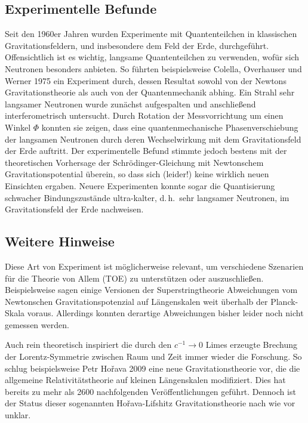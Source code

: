 \documentclass{scrartcl}
\begin{document}
\subsection*{Experimentelle Befunde}

Seit den 1960er Jahren wurden Experimente mit Quantenteilchen in klassischen Gravitationsfeldern, und insbesondere dem Feld der Erde, durchgeführt. 
Offensichtlich ist es wichtig, langsame Quantenteilchen zu verwenden, wofür sich Neutronen besonders anbieten. So führten beispielsweise Colella, Overhauser und Werner 1975 ein Experiment durch, dessen Resultat sowohl von der Newtons Gravitationstheorie als auch von der Quantenmechanik abhing. Ein Strahl sehr langsamer Neutronen wurde zunächst aufgespalten und anschließend interferometrisch untersucht. Durch Rotation der Messvorrichtung um einen Winkel $\Phi$ konnten sie zeigen, dass eine quantenmechanische Phasenverschiebung der langsamen Neutronen durch deren Wechselwirkung mit dem Gravitationsfeld der Erde auftritt. Der experimentelle Befund stimmte jedoch bestens mit der theoretischen Vorhersage der Schrödinger-Gleichung mit Newtonschem Gravitationspotential überein, so dass sich (leider!) keine wirklich neuen Einsichten ergaben. Neuere Experimenten konnte sogar die Quantisierung schwacher Bindungszustände ultra-kalter, d.\,h.\ sehr langsamer Neutronen, im Gravitationsfeld der Erde nachweisen.


\subsection*{Weitere Hinweise}

Diese Art von Experiment ist möglicherweise relevant, um verschiedene Szenarien für die Theorie von Allem (TOE) zu unterstützen oder auszuschließen. Beispielsweise sagen einige Versionen der Superstringtheorie Abweichungen vom Newtonschen Gravitationspotenzial auf Längenskalen weit überhalb der Planck-Skala voraus. Allerdings konnten derartige Abweichungen bisher leider noch nicht gemessen werden.

Auch rein theoretisch inspiriert die durch den $c^{−1}\rightarrow 0$ Limes erzeugte Brechung der Lorentz-Symmetrie zwischen Raum und Zeit immer wieder die Forschung. So schlug beispielsweise Petr Hořava 2009 eine neue Gravitationstheorie vor, die die allgemeine Relativitätstheorie auf kleinen Längenskalen modifiziert. Dies hat bereits zu mehr als \num{2600} nachfolgenden Veröffentlichungen geführt. Dennoch ist der Status dieser sogenannten Hořava-Lifshitz Gravitationstheorie nach wie vor unklar.
\end{document}
